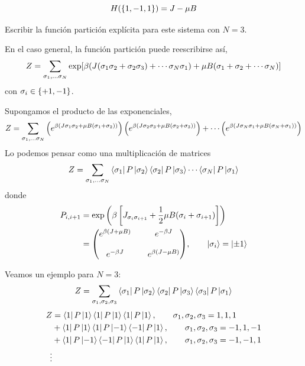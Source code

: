 \begin{equation}
 H(\{1,-1,1\})=J-\mu B
\end{equation}

\begin{ej}
	Escribir la función partición explícita para este sistema con $N=3$.
\end{ej}
En el caso general, la función partición puede reescribirse así,
\begin{equation}
  Z=\sum_{\sigma_1,...\sigma_N}\exp[\beta (J(\sigma_1\sigma_2+\sigma_2\sigma_3)+\cdots \sigma_N\sigma_1)+\mu B(\sigma_1+\sigma_2+\cdots \sigma_N)]
\end{equation}
con $\sigma_i\in \{+1,-1\}$.

Supongamos el producto de las exponenciales,
\begin{equation}
  Z=\sum_{\sigma_1,...\sigma_N}\left(e^{\beta(J\sigma_1\sigma_2+\mu B(\sigma_1+\sigma_2))}\right)\left(e^{\beta(J\sigma_2\sigma_3+\mu B(\sigma_2+\sigma_3))}\right)+\cdots \left(e^{\beta(J\sigma_N\sigma_1+\mu B(\sigma_N+\sigma_1))}\right)
\end{equation}
Lo podemos pensar como una multiplicación de matrices
\begin{equation}\label{32.star}
   Z=\sum_{\sigma_1,...\sigma_N}\bra{\sigma_1}P\ket{\sigma_2}\bra{\sigma_2}P\ket{\sigma_3}\cdots \bra{\sigma_N}P\ket{\sigma_1}
\end{equation}
donde
\begin{align}
  P_{i,i+1}&=\exp\left(\b\left[J_{\s_i\s_{i+1}}+\frac{1}{2}\m B(\s_i+\s_{i+1})\right]\right)\\
  &=\mqty(e^{\b(J+\m B)}&&e^{-\b J}\\\\
  e^{-\b J}&& e^{\b (J-\m B)}),\qquad \ket{\s_i}=\ket{\pm 1}
\end{align}

Veamos un ejemplo para $N=3$:
\begin{equation}
  Z=\sum_{\sigma_1,\sigma_2,\sigma_3}\bra{\sigma_1}P\ket{\sigma_2}\bra{\sigma_2}P\ket{\sigma_3}\bra{\sigma_3}P\ket{\sigma_1}
\end{equation}
\begin{align}
  Z&=\bra{1}P\ket{1}\bra{1}P\ket{1}\bra{1}P\ket{1},\qquad \sigma_1,\sigma_2,\sigma_3=1,1,1\\
  &+\bra{1}P\ket{1}\bra{1}P\ket{-1}\bra{-1}P\ket{1},\qquad \sigma_1,\sigma_2,\sigma_3=-1,1,-1\\
  &+\bra{1}P\ket{-1}\bra{-1}P\ket{1}\bra{1}P\ket{1},\qquad \sigma_1,\sigma_2,\sigma_3=-1,-1,1\\
  \vdots 
\end{align}

